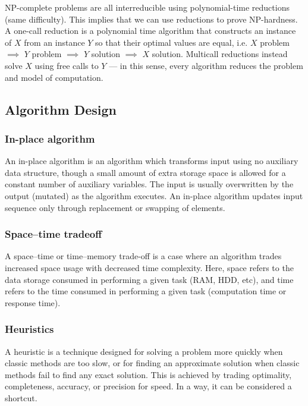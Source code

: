 \documentclass{article}
\begin{document}
    NP-complete problems are all interreducible using polynomial-time reductions (same difficulty). This implies that we can use reductions to prove NP-hardness. A one-call reduction is a polynomial time algorithm that constructs an instance of $X$ from an instance $Y$ so that their optimal values are equal, i.e. $X$ problem $\implies$ $Y$ problem $\implies$ $Y$ solution $\implies$ $X$ solution. Multicall reductions instead solve $X$ using free calls to $Y$ — in this sense, every algorithm reduces the problem and model of computation.
    
    
    \subsection{Algorithm Design}
    \subsubsection{In-place algorithm}
        An in-place algorithm is an algorithm which transforms input using no auxiliary data structure, though a small amount of extra storage space is allowed for a constant number of auxiliary variables. The input is usually overwritten by the output (mutated) as the algorithm executes. An in-place algorithm updates input sequence only through replacement or swapping of elements.
        
    \subsubsection{Space–time tradeoff}
        A space–time or time–memory trade-off is a case where an algorithm trades increased space usage with decreased time complexity. Here, space refers to the data storage consumed in performing a given task (RAM, HDD, etc), and time refers to the time consumed in performing a given task (computation time or response time).
        
    \subsubsection{Heuristics}
        A heuristic is a technique designed for solving a problem more quickly when classic methods are too slow, or for finding an approximate solution when classic methods fail to find any exact solution. This is achieved by trading optimality, completeness, accuracy, or precision for speed. In a way, it can be considered a shortcut.
    
\end{document}
